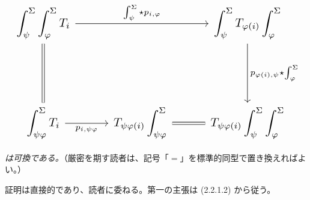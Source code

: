 \begin{equation*}
  \resizebox{\textwidth}{!}{%
    $\begin{tikzcd}[ampersand replacement=\&,column sep=2.8em,row sep=5.0em]
      \displaystyle\int_\psi^\Sigma\int_\varphi^\Sigma T_i
        \arrow[rr,"{\int_\psi^\Sigma\star p_{i,\varphi}}"]
        \arrow[d,equal]
        \& {}
        \& \displaystyle\int_\psi^\Sigma T_{\varphi(i)}\int_\varphi^\Sigma
          \arrow[d,"{p_{\varphi(i),\psi}\star\int_\varphi^\Sigma}"] \\
      \displaystyle\int_{\psi\varphi}^\Sigma T_i
        \arrow[r,"{p_{i,\psi\varphi}}"']
        \& \displaystyle T_{\psi\varphi(i)}\int_{\psi\varphi}^\Sigma
          \arrow[r,equal]
        \& \displaystyle T_{\psi\varphi(i)}\int_\psi^\Sigma\int_\varphi^\Sigma
    \end{tikzcd}$%
  }
\end{equation*}

\emph{は可換である。}（厳密を期す読者は、記号「$=$」を標準的同型で置き換えればよい。）

証明は直接的であり、読者に委ねる。第一の主張は (2.2.1.2) から従う。
